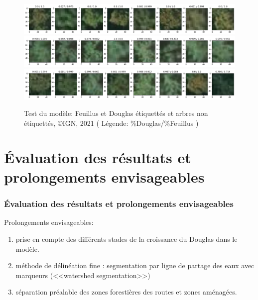 \documentclass{beamer}
\begin{document}
\begin{frame}
	\begin{figure}
		\includegraphics[scale=0.3]{res3.png}
		\includegraphics[scale=0.3]{res4.png}
		\includegraphics[scale=0.3]{res5.png}
		\caption{Test du modèle: Feuillus et Douglas étiquettés et arbres non étiquettés, \copyright IGN, 2021 ( Légende: \%Douglas/\%Feuillus )}
	\end{figure}
\end{frame}

\section{\'{E}valuation des résultats et prolongements envisageables}

\begin{frame}


	\frametitle{\'{E}valuation des résultats et prolongements envisageables}
	Prolongements envisageables: 
	\begin{enumerate}
	\item prise en compte des différents stades de la croissance du Douglas dans le modèle.
	\item méthode de délinéation fine : segmentation par ligne de partage des eaux avec marqueurs (<<watershed segmentation>>)
	\item séparation préalable des zones forestières des routes et zones aménagées. 
	\end{enumerate}
\end{frame}
\end{document}
